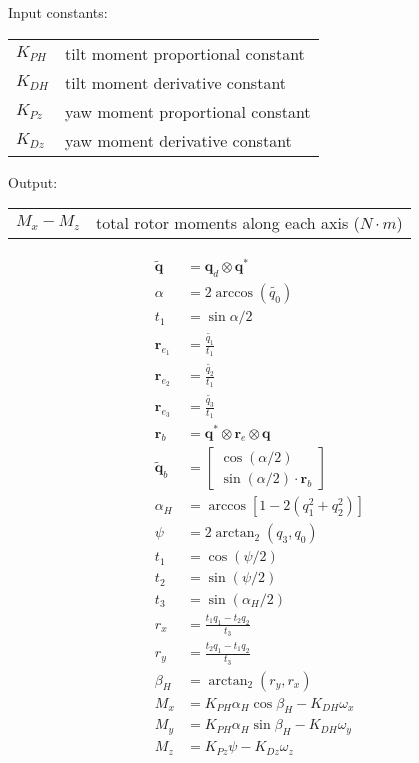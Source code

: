 \documentclass{article}
\numberwithin{equation}{section} %
\newcommand{\bs}[1]{\boldsymbol{#1}}
\begin{document}
\bigskip

Input constants:
\begin{tabular}{l l}
 	$K_{PH} $				& tilt moment proportional constant \\
 	$K_{DH} $				& tilt moment derivative constant \\
 	$K_{Pz} $				& yaw moment proportional constant \\
 	$K_{Dz} $				& yaw moment derivative constant \\ 	
\end{tabular}

\bigskip

Output:
\begin{tabular}{l l}
	$ M_{x} - M_{z} $		& total rotor moments along each axis ($N \cdot m$) \\
\end{tabular}



\begin{align}
\tilde{\bs{q}} &= \bs{q}_d \otimes \bs{q}^* \\%
\alpha &= 2\arccos{\left(\tilde{q_0}\right)} \\%
t_1 &= \sin{\alpha/2} \\
\bs{r}_{e_1} &= \frac{\tilde{q_1}}{t_1} \\
\bs{r}_{e_2} &= \frac{\tilde{q_2}}{t_1} \\
\bs{r}_{e_3} &= \frac{\tilde{q_3}}{t_1} \\
\bs{r}_b &= \bs{q}^* \otimes \bs{r}_e \otimes \bs{q} \\
\tilde{\bs{q}}_b &= 
\begin{bmatrix}
	\cos \left( \alpha / 2 \right) \\
	\sin \left( \alpha / 2 \right) \cdot \bs{r}_b
\end{bmatrix} \\
	\alpha_H &= \arccos \left[1 - 2 \left( q_1^2 + q_2^2 \right) \right] \\
	\psi &= 2 \arctan_2 \left( q_3, q_0 \right) \\
	t_1 &= \cos \left( \psi / 2 \right) \\
	t_2 &= \sin \left( \psi / 2 \right) \\
	t_3 &= \sin \left( \alpha_H / 2 \right) \\
	r_x &=   \frac{ t_1 q_1 - t_2 q_2}{ t_3} \\
	r_y &=   \frac{t_2 q_1 - t_1 q_2} { t_3 }  \\
	\beta_H &= \arctan_2 \left(r_y, r_x \right) \\
	M_x &= K_{PH} \alpha_H \cos \beta_H - K_{DH} \omega_x \\
	M_y &= K_{PH} \alpha_H \sin \beta_H - K_{DH} \omega_y \\
	M_z &= K_{Pz} \psi - K_{Dz} \omega_z \\
\end{align}
\end{document}
